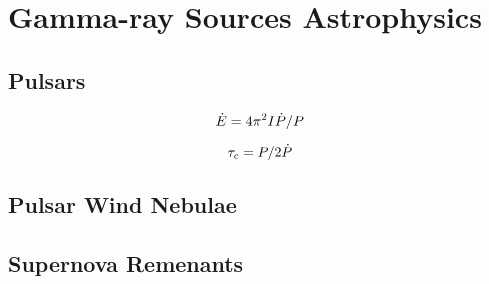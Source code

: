 
\section{Gamma-ray Sources Astrophysics}
\subsection{Pulsars}

\begin{equation}
  \dot{E} = 
  4\pi^2 I \dot{P}/P
\end{equation}

\begin{equation}
  \tau_c = P/2\dot{P}
\end{equation}


\subsection{Pulsar Wind Nebulae}
\subsection{Supernova Remenants}

